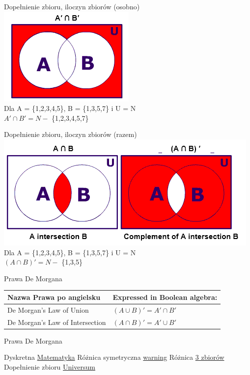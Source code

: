 \documentclass{beamer}
\begin{document}
\begin{frame}{Dopełnienie zbioru, iloczyn zbiorów (osobno)}
\includegraphics{uOsobno}\\
Dla A = \{1,2,3,4,5\}, B = \{1,3,5,7\}  i U = N \\
$A'\cap B'=N-$ \{1,2,3,4,5,7\}
\end{frame}

\begin{frame}{Dopełnienie zbioru, iloczyn zbiorów (razem)}
\includegraphics[scale=0.9]{uRazem}\\
Dla A = \{1,2,3,4,5\}, B = \{1,3,5,7\}  i U = N \\
$(A\cap B)'=N-$ \{1,3,5\}
\end{frame}

\begin{frame}{Prawa De Morgana}
\begin{tabular}{l|l}
Nazwa Prawa po angielsku & Expressed in Boolean algebra: \\ \hline 
De Morgan’s Law of Union & $ (A \cup B)' = A' \cap B' $ \\
 De Morgan’s Law of Intersection &  $(A \cap B)' = A' \cup B'$ \\
\end{tabular}
\end{frame}

\begin{frame}{Prawa De Morgana}
\begin{thebibliography}{3}
 Dyskretna \href{https://inf.ug.edu.pl/~zylinski/dydaktyka/}{Matematyka}
 Różnica symetryczna \href{https://wojcienty.com/artykul/7/matematyka/zbiory/}{warning}
 Różnica \href{https://www.quora.com/How-do-you-show-that-the-symmetric-difference-is-associative-for-any-three-sets-A-B-C}{3 zbiorów}
 Dopełnienie zbioru \href{https://www.askiitians.com/iit-jee-algebra/set-relations-functions/set-theory/complement-of-a-set/}{Universum}
\end{thebibliography}
\end{frame}
\end{document}
